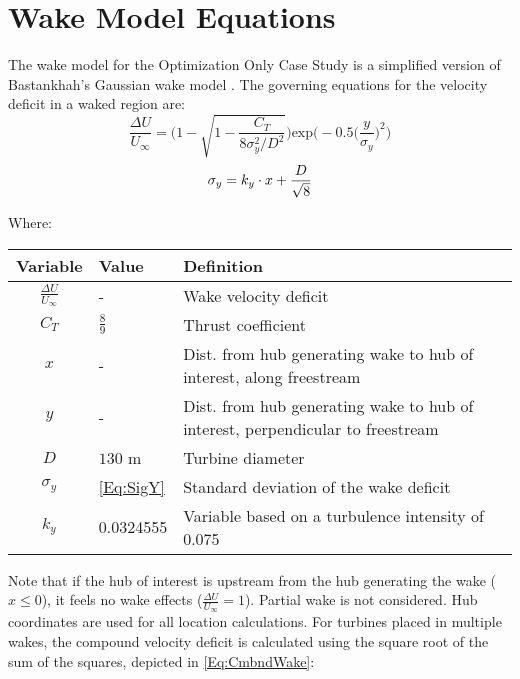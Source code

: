 \documentclass[12pt]{article}
\begin{document}
\newpage
\section*{Wake Model Equations}
    The wake model for the Optimization Only Case Study is a simplified version of Bastankhah's Gaussian wake model \cite{Thomas2018}. The governing equations for the velocity deficit in a waked region are:
    \begin{equation}
        \frac{\Delta U}{U_{\infty}}
        =
        \Bigg(
            1 - \sqrt{
                1 - \frac{C_T}
                    {8\sigma_{y}^{2}/D^2}
                }
        \Bigg)
                \text{exp}\bigg(
                    -0.5\Big(
                        \frac{y}{\sigma_{y}}
                    \Big)^2
                \bigg)
        \label{Eq:Bast}
    \end{equation}
    \begin{equation}
        \sigma_y = k_y\cdot x + \frac{D}{\sqrt{8}} \\
        \label{Eq:SigY}
    \end{equation}
    
    Where:
    
    \begin{table}[H]
        \centering
        \begin{tabular}{|c|l|l|}
            \hline
             Variable & Value & Definition \\ \hline
            $\frac{\Delta U}{U_{\infty}}$ & - & Wake velocity deficit \\ \hline
            $C_T$ & $\frac{8}{9}$ & Thrust coefficient \\ \hline
            $x$ & - & Dist. from hub generating wake to hub of interest, along freestream \\ \hline
            $y$ & - & Dist. from hub generating wake to hub of interest, perpendicular to freestream \\ \hline
            $D$ & $130$ m & Turbine diameter \\ \hline
            $\sigma_y$ & \cref{Eq:SigY} & Standard deviation of the wake deficit \\ \hline
            $k_y$ & 0.0324555 & Variable based on a turbulence intensity of 0.075 \cite{Thomas2018, Niayifar2016} \\ \hline
        \end{tabular}
    \end{table}
\vspace{-0.25cm}
    Note that if the hub of interest is upstream from the hub generating the wake ($x \leq 0$), it feels no wake effects ($\frac{\Delta U}{U_{\infty}} = 1$). Partial wake is not considered. Hub coordinates are used for all location calculations. For turbines placed in multiple wakes, the compound velocity deficit is calculated using the square root of the sum of the squares, depicted in \cref{Eq:CmbndWake}:
    
\end{document}
